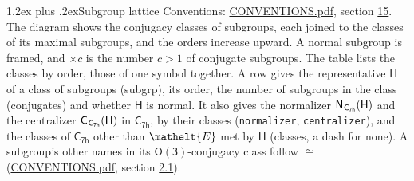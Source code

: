 \documentclass[10pt,a4paper]{article}
\makeatletter
\renewcommand\section{\@startsection{section}{1}{\z@}{-3ex plus -1ex minus -.2ex}%
  {1.2ex plus .2ex}{\normalfont\large\sffamily\bfseries\color{parttitle}}}
\numberwithin{equation}{section}
\newcommand{\eltfont}[1]{{\let\sigma\eltsigma\mathelt{#1}}}
\newcommand{\grp}[1]{\mathsf{#1}}
\newcommand{\cls}[1]{\eltfont{#1}}
\newcommand{\samecls}{\cong}
\newcommand{\hairsp}{\mkern1mu}
\makeatother
\begin{document}
\section{Subgroup lattice}\label{s:subgroups}
Conventions: \href{../../CONVENTIONS.pdf}{CONVENTIONS.pdf}, section \href{../../CONVENTIONS.pdf\#conv.15}{15}.
The diagram shows the conjugacy classes of subgroups, each joined to the classes of its maximal subgroups, and the orders increase upward. \label{n:index.conjugates.c}A normal subgroup is framed, and ${\times}c$ is the number $c > 1$ of conjugate subgroups. The table lists the classes by order, those of one symbol together. \label{n:group.H}\label{n:head.subgroup}\label{n:head.order}\label{n:head.conjugates}\label{n:head.normal}A row gives the representative $\grp{H}$ of a class of subgroups (subgrp), its order, the number of subgroups in the class (conjugates) and whether $\grp{H}$ is normal. \label{n:group.normalizer}\label{n:group.centralizer}\label{n:head.classes}It also gives the normalizer $\grp{N}_{\hairsp \grp{C_{7h}}}(\grp{H})$ and the centralizer $\grp{C}_{\hairsp \grp{C_{7h}}}(\grp{H})$ in $\grp{C_{7h}}$, by their classes (\texttt{normalizer}, \texttt{centralizer}), and the classes of $\grp{C_{7h}}$ other than $\cls{E}$ met by $\grp{H}$ (classes, a dash for none). A subgroup's other names in its \href{O3.pdf}{$\grp{O(3)}$}-conjugacy class follow $\samecls$ (\href{../../CONVENTIONS.pdf}{CONVENTIONS.pdf}, section \href{../../CONVENTIONS.pdf\#conv.2.1}{2.1}).
\begin{center}
\end{center}
\end{document}
